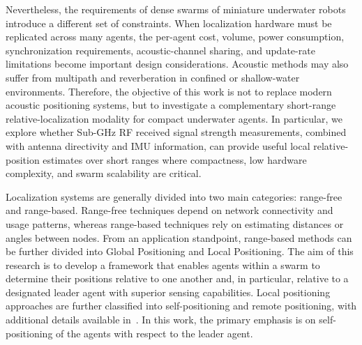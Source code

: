 \documentclass[subscriptcorrection,upint,varvw,barcolor=Goldenrod3,mathalfa=cal=euler,balance,hyphenate,pdf-a]{asmejour}
\begin{document}
Nevertheless, the requirements of dense swarms of miniature underwater robots introduce a different set of constraints. When localization hardware must be replicated across many agents, the per-agent cost, volume, power consumption, synchronization requirements, acoustic-channel sharing, and update-rate limitations become important design considerations. Acoustic methods may also suffer from multipath and reverberation in confined or shallow-water environments. Therefore, the objective of this work is not to replace modern acoustic positioning systems, but to investigate a complementary short-range relative-localization modality for compact underwater agents. In particular, we explore whether Sub-GHz RF received signal strength measurements, combined with antenna directivity and IMU information, can provide useful local relative-position estimates over short ranges where compactness, low hardware complexity, and swarm scalability are critical.

Localization systems are generally divided into two main categories: range-free and range-based. Range-free techniques depend on network connectivity and usage patterns, whereas range-based techniques rely on estimating distances or angles between nodes. From an application standpoint, range-based methods can be further divided into Global Positioning and Local Positioning. The aim of this research is to develop a framework that enables agents within a swarm to determine their positions relative to one another and, in particular, relative to a designated leader agent with superior sensing capabilities. Local positioning approaches are further classified into self-positioning and remote positioning, with additional details available in~\cite{zekavat2019handbook}. In this work, the primary emphasis is on self-positioning of the agents with respect to the leader agent.
\end{document}
